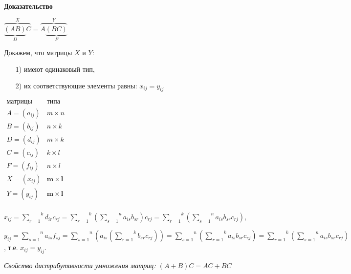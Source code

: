 \vspace*{15pt}

{\bf {Доказательство}}

\vspace*{15pt}

$\overbrace{\underbrace{(AB)}_{D}C}^{X} = \overbrace{A\underbrace{(BC)}_{F}}^{Y}$


Докажем, что матрицы $X$ и $Y$:
\begin{enumerate}
    \item[1)] имеют одинаковый тип,
    \item[2)] их соответствующие элементы равны: $x_{ij} = y_{ij}$ 
\end{enumerate}

    $
    \begin{array}{ c|c } 
     \text {матрицы} & \text{типа} \\
     \hline
     A = (a_{ij}) & m \times n \\ 
     B = (b_{ij}) & n \times k \\ 
     D = (d_{ij}) & m \times k \\  
     C = (c_{ij}) & k \times l \\ 
     F = (f_{ij}) & n \times l \\ 
     X = (x_{ij}) & \mathbf{m \times l} \\ 
     Y = (y_{ij}) & \mathbf{m \times l} \\ 
    \end{array}
    $

    \vspace*{15pt}
    $x_{ij} =\overset{k}{\underset{r = 1}{\sum}}d_{ir}c_{rj} = \overset{k}{\underset{r = 1}{\sum}}(\overset{n}{\underset{s = 1}{\sum}}a_{is}b_{sr})c_{rj} = \overset{k}{\underset{r = 1}{\sum}}(\overset{n}{\underset{s = 1}{\sum}}a_{is}b_{sr}c_{rj})$,
    
    $y_{ij} = \overset{n}{\underset{s = 1}{\sum}}a_{is}f_{sj} = \overset{n}{\underset{s = 1}{\sum}}(a_{is}(\overset{k}{\underset{r = 1}{\sum}}b_{sr}c_{rj})) = \overset{n}{\underset{s = 1}{\sum}}(\overset{k}{\underset{r = 1}{\sum}}a_{is}b_{sr}c_{rj}) = \overset{k}{\underset{r = 1}{\sum}}(\overset{n}{\underset{s = 1}{\sum}}a_{is}b_{sr}c_{rj})$, т.е. $x_{ij} = y_{ij}$.

    \ep

    \textit {Свойство дистрибутивности умножения матриц: $(A + B)C = AC + BC$}

    \vspace*{15pt}

